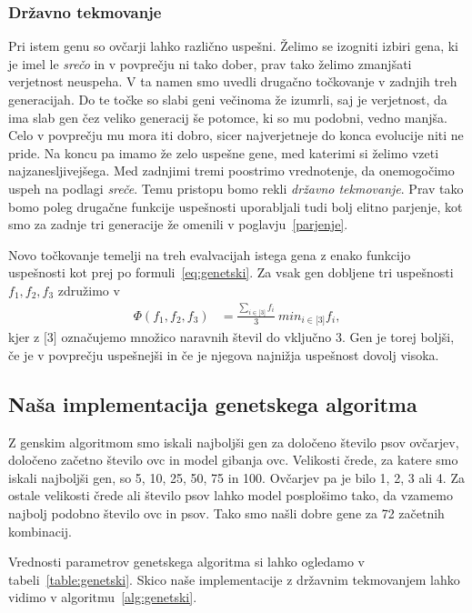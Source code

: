 \subsubsection{Državno tekmovanje}

Pri istem genu so ovčarji lahko različno uspešni. Želimo se izogniti izbiri gena, ki je imel le \textit{srečo} in v povprečju ni tako dober, prav tako želimo zmanjšati verjetnost neuspeha. V ta namen smo uvedli drugačno točkovanje v zadnjih treh generacijah. Do te točke so slabi geni večinoma že izumrli, saj je verjetnost, da ima slab gen čez veliko generacij še potomce, ki so mu podobni, vedno manjša. Celo v povprečju mu mora iti dobro, sicer najverjetneje do konca evolucije niti ne pride. Na koncu pa imamo že zelo uspešne gene, med katerimi si želimo vzeti najzanesljivejšega. Med zadnjimi tremi poostrimo vrednotenje, da onemogočimo uspeh na podlagi \textit{sreče}. Temu pristopu bomo rekli \textit{državno tekmovanje}. Prav tako bomo poleg drugačne funkcije uspešnosti uporabljali tudi bolj elitno parjenje, kot smo za zadnje tri generacije že omenili v poglavju~\ref{parjenje}.

Novo točkovanje temelji na treh evalvacijah istega gena z enako funkcijo uspešnosti kot prej po formuli~\eqref{eq:genetski}. Za vsak gen dobljene tri uspešnosti $f_1, f_2, f_3$ združimo v 
\begin{align}
\Phi(f_1, f_2, f_3) &=\frac{\sum_{i\in\lbrack 3\rbrack} f_i}{3}~ min_{i\in\lbrack 3\rbrack} f_i, \label{eq:drzavno}
\end{align}
kjer z $\lbrack 3\rbrack$ označujemo množico naravnih števil do vključno 3. Gen je torej boljši, če je v povprečju uspešnejši in če je njegova najnižja uspešnost dovolj visoka.

\subsection{Naša implementacija genetskega algoritma}

Z genskim algoritmom smo iskali najboljši gen za določeno število psov ovčarjev, določeno začetno število ovc in model gibanja ovc. Velikosti črede, za katere smo iskali najboljši gen, so 5, 10, 25, 50, 75 in 100. Ovčarjev pa je bilo 1, 2, 3 ali 4. Za ostale velikosti črede ali število psov lahko model posplošimo tako, da vzamemo najbolj podobno število ovc in psov. Tako smo našli dobre gene za 72 začetnih kombinacij.

Vrednosti parametrov genetskega algoritma si lahko ogledamo v tabeli~\ref{table:genetski}. Skico naše implementacije z državnim tekmovanjem lahko vidimo v algoritmu~\ref{alg:genetski}.

